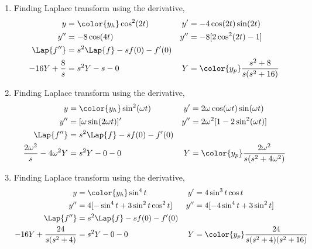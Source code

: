 \begin{enumerate}
    \item Finding Laplace transform using the derivative,
          \begin{align}
              y                  & = \color{y_h} \cos^2(2t)             &
              y'                 & = -4\cos(2t)\sin(2t)                   \\
              y''                & = -8 \cos(4t)                        &
              y''                & = -8[2\cos^2(2t) - 1]                  \\
              \Lap\{f''\}        & = s^2\Lap\{f\} - sf(0) - f'(0)         \\
              -16Y + \frac{8}{s} & = s^2Y - s - 0                       &
              Y                  & = \color{y_p}\frac{s^2+8}{s(s^2+16)}
          \end{align}

    \item Finding Laplace transform using the derivative,
          \begin{align}
              y             & = \color{y_h} \sin^2(\omega t)        &
              y'            & = 2\omega\cos(\omega t)\sin(\omega t)   \\
              y''           & = [\omega\sin(2\omega t)]'            &
              y''           & = 2\omega^2[1 - 2\sin^2(\omega t)]      \\
              \Lap\{f''\}   & = s^2\Lap\{f\} - sf(0) - f'(0)          \\
              \frac{2\omega^2}{s}
              - 4\omega^2 Y & = s^2Y - 0 - 0                        &
              Y             & = \color{y_p}\frac{2\omega^2}
              {s(s^2+4\omega^2)}
          \end{align}

    \item Finding Laplace transform using the derivative,
          \begin{align}
              y                            & = \color{y_h} \sin^4 t             &
              y'                           & = 4\sin^3 t\cos t                    \\
              y''                          & = 4[-\sin^4 t + 3\sin^2 t\cos^2 t] &
              y''                          & = 4[-4\sin^4 t + 3\sin^2 t]          \\
              \Lap\{f''\}                  & = s^2\Lap\{f\} - sf(0) - f'(0)       \\
              -16Y + \frac{24}{s(s^2 + 4)} & = s^2Y - 0 - 0                     &
              Y                            & = \color{y_p}\frac{24}
              {s(s^2+4)(s^2 + 16)}
          \end{align}


\end{enumerate}
